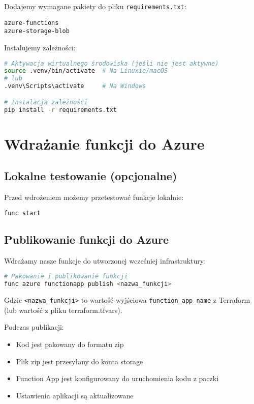 \documentclass{article}
\begin{document}
Dodajemy wymagane pakiety do pliku \texttt{requirements.txt}:

\begin{lstlisting}
azure-functions
azure-storage-blob
\end{lstlisting}

Instalujemy zależności:

\begin{lstlisting}[language=bash]
# Aktywacja wirtualnego środowiska (jeśli nie jest aktywne)
source .venv/bin/activate  # Na Linuxie/macOS
# lub
.venv\Scripts\activate     # Na Windows

# Instalacja zależności
pip install -r requirements.txt
\end{lstlisting}

\section{Wdrażanie funkcji do Azure}

\subsection{Lokalne testowanie (opcjonalne)}

Przed wdrożeniem możemy przetestować funkcje lokalnie:

\begin{lstlisting}[language=bash]
func start
\end{lstlisting}

\subsection{Publikowanie funkcji do Azure}

Wdrażamy nasze funkcje do utworzonej wcześniej infrastruktury:

\begin{lstlisting}[language=bash]
# Pakowanie i publikowanie funkcji
func azure functionapp publish <nazwa_funkcji>
\end{lstlisting}

Gdzie \texttt{<nazwa\_funkcji>} to wartość wyjściowa \texttt{function\_app\_name} z Terraform (lub wartość z pliku terraform.tfvars).

Podczas publikacji:
\begin{itemize}
    \item Kod jest pakowany do formatu zip
    \item Plik zip jest przesyłany do konta storage
    \item Function App jest konfigurowany do uruchomienia kodu z paczki
    \item Ustawienia aplikacji są aktualizowane
\end{itemize}
\end{document}
